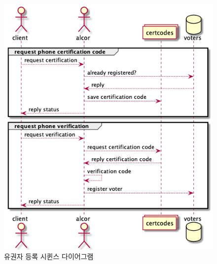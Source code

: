 \documentclass[10pt,a4paper,left=15mm,right=15mm,top=20mm,bottom=20mm]{article}
\begin{document}
    \begin{figure}[h]
        \begin{center}
            \includegraphics[width=14cm]{client-register}
            \caption{유권자 등록 시퀸스 다이어그램}
        \end{center}
    \end{figure}
\end{document}

